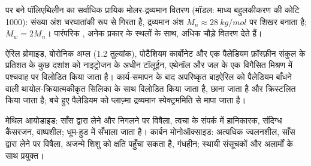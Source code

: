 \begin{omfigure}

{\small {} पर बने पॉलिएथिलीन का सर्वाधिक प्रायिक मोलर-द्रव्यमान वितरण
(मॉडल: माध्य बहुलकीकरण की कोटि 1000): संख्या
अंश चरघातांकी रूप से गिरता है, द्रव्यमान अंश $M_n \approx \qty{28}{kg/mol}$ पर शिखर बनाता है; $M_w = 2M_n$। पारंपरिक
, अनेक प्रकार के स्थलों के साथ, अधिक चौड़े
वितरण देते हैं।}
\end{omfigure}

\begin{inthelab}[एक सुज़ुकी युग्मन और उसका पैलेडियम]
ऐरिल ब्रोमाइड, बोरोनिक अम्ल (1.2 तुल्यांक), पोटैशियम कार्बोनेट और
एक पैलेडियम फ़ॉस्फ़ीन संकुल के प्रतिशत के कुछ दशांश को नाइट्रोजन के अधीन टॉलूईन, एथेनॉल और जल के एक
विगैसित मिश्रण में पश्चवाह पर विलोडित किया जाता है। कार्य-समापन के बाद
अपरिष्कृत बाइऐरिल को पैलेडियम बाँधने वाली थायोल-क्रियात्मकीकृत सिलिका के साथ विलोडित किया जाता है,
छाना जाता है और क्रिस्टलित किया जाता है; बचे हुए पैलेडियम को
प्लाज़्मा द्रव्यमान स्पेक्ट्रममिति से मापा जाता है।
\end{inthelab}

\begin{safety}{}
मेथिल आयोडाइड: साँस द्वारा लेने और निगलने पर विषैला, त्वचा के संपर्क में हानिकारक, संदिग्ध
कैंसरजन, वाष्पशील; धूम-हुड में सँभाला जाता है। कार्बन मोनोऑक्साइड: अत्यधिक
ज्वलनशील, साँस द्वारा लेने पर विषैला, अजन्मे शिशु को क्षति पहुँचा सकता है, गंधहीन;
स्थायी संसूचकों और अलार्मों के साथ प्रयुक्त।
\end{safety}


